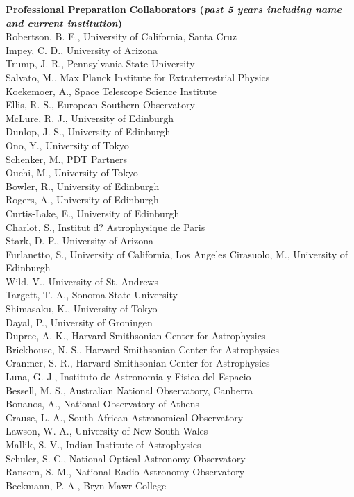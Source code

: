 \documentclass[11pt,letterpaper,english]{article}
\begin{document}
\begin{flushleft} {\bf Professional Preparation}
\vspace{-6pt}
{\bf Collaborators ({\emph{past 5 years including name and current institution}})} \\
{\parindent 16pt
Robertson, B. E., University of California, Santa Cruz \\
Impey, C. D., University of Arizona \\
Trump, J. R., Pennsylvania State University \\
Salvato, M., Max Planck Institute for Extraterrestrial Physics \\
Koekemoer, A., Space Telescope Science Institute \\
Ellis, R. S., European Southern Observatory \\
McLure, R. J., University of Edinburgh \\
Dunlop, J. S., University of Edinburgh \\
Ono, Y., University of Tokyo \\
Schenker, M., PDT Partners \\
Ouchi, M., University of Tokyo \\
Bowler, R., University of Edinburgh \\
Rogers, A., University of Edinburgh \\
Curtis-Lake, E., University of Edinburgh \\
Charlot, S., Institut d? Astrophysique de Paris \\
Stark, D. P., University of Arizona \\
Furlanetto, S., University of California, Los Angeles Cirasuolo, M., University of Edinburgh \\
Wild, V., University of St. Andrews \\
Targett, T. A., Sonoma State University \\
Shimasaku, K., University of Tokyo \\
Dayal, P., University of Groningen \\
Dupree, A. K., Harvard-Smithsonian Center for Astrophysics \\
Brickhouse, N. S., Harvard-Smithsonian Center for Astrophysics \\
Cranmer, S. R., Harvard-Smithsonian Center for Astrophysics \\
Luna, G. J., Instituto de Astronomia y Fisica del Espacio \\
Bessell, M. S., Australian National Observatory, Canberra \\
Bonanos, A., National Observatory of Athens \\
Crause, L. A., South African Astronomical Observatory \\
Lawson, W. A., University of New South Wales \\
Mallik, S. V., Indian Institute of Astrophysics \\
Schuler, S. C., National Optical Astronomy Observatory \\
Ransom, S. M., National Radio Astronomy Observatory \\
Beckmann, P. A., Bryn Mawr College \\
}


\end{flushleft}
\end{document}

